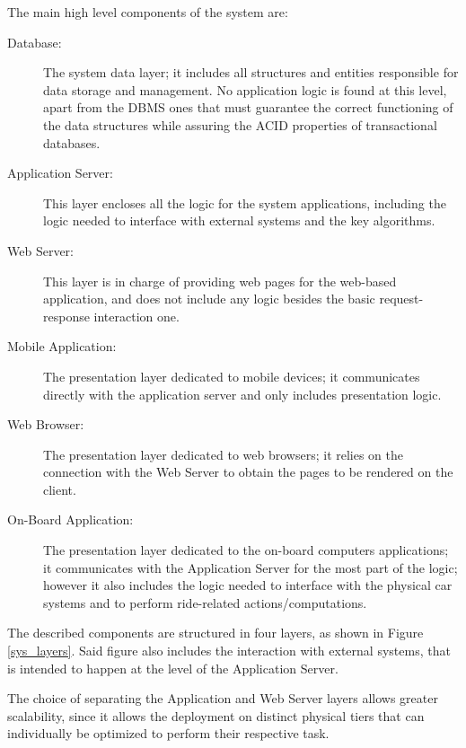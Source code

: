 The main high level components of the system are:

\begin{description}
\item[Database:] The system data layer; it includes all structures and entities responsible for data storage and management. No application logic is found at this level, apart from the DBMS ones that must guarantee the correct functioning of the data structures while assuring the ACID properties of transactional databases.
\item[Application Server:] This layer encloses all the logic for the system applications, including the logic needed to interface with external systems and the key algorithms.
\item[Web Server:] This layer is in charge of providing web pages for the web-based application, and does not include any logic besides the basic request-response interaction one.
\item[Mobile Application:] The presentation layer dedicated to mobile devices; it communicates directly with the application server and only includes presentation logic.
\item[Web Browser:] The presentation layer dedicated to web browsers; it relies on the connection with the Web Server to obtain the pages to be rendered on the client.
\item[On-Board Application:] The presentation layer dedicated to the on-board computers applications; it communicates with the Application Server for the most part of the logic; however it also includes the logic needed to interface with the physical car systems and to perform ride-related actions/computations.
\end{description}

The described components are structured in four layers, as shown in Figure \ref{sys_layers}. Said figure also includes the interaction with external systems, that is intended to happen at the level of the Application Server.

The choice of separating the Application and Web Server layers allows greater scalability, since it allows the deployment on distinct physical tiers that can individually be optimized to perform their respective task.

